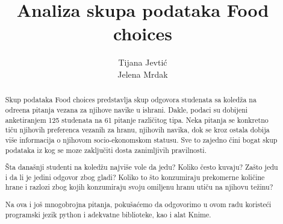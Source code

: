 \documentclass[12pt,a4paper]{article}
\title{Analiza skupa podataka Food choices}
\author{Tijana Jevti\' c \\ Jelena Mrdak}
\begin{document}
\maketitle

\begin{abstract}
Skup podataka Food choices predstavlja skup odgovora studenata sa koled\v za na odre\dj ena pitanja vezana za njihove navike u ishrani. Dakle, podaci su dobijeni anketiranjem 125 studenata na 61 pitanje razli\v citog tipa. Neka pitanja se konkretno ti\v cu njihovih preferenca vezanih za hranu, njihovih navika, dok se kroz ostala dobija vi\v se informacija o njihovom socio-ekonomskom statusu. Sve to zajedno \v cini bogat skup podataka iz kog se moze zaklju\v citi dosta zanimljivih pravilnosti.

\v Sta dana\v snji studenti na koled\v zu najvi\v se vole da jedu? Koliko \v cesto kuvaju? Za\v sto jedu i da li je jedini odgovor zbog gladi? Koliko to \v sto konzumiraju prekomerne koli\v cine hrane i razlozi zbog kojih konzumiraju svoju omiljenu hranu uti\v cu na njihovu te\v zinu?

Na ova i jo\v s mnogobrojna pitanja, poku\v sa\' cemo da odgovorimo u ovom radu koriste\' ci programski jezik python i adekvatne biblioteke, kao i alat Knime.
\end{abstract}

\newpage

\tableofcontents

\newpage
\end{document}
